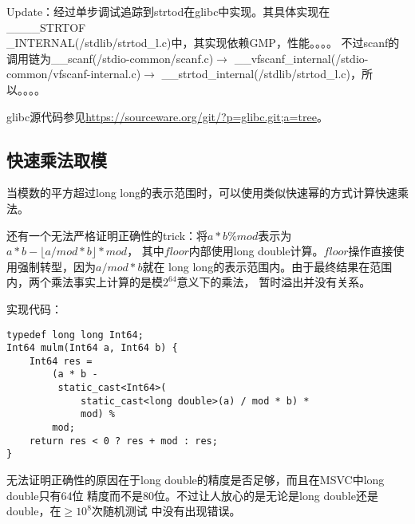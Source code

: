 Update：经过单步调试追踪到strtod在glibc中实现。其具体实现在
\_\_\_\_STRTOF\\\_INTERNAL(/stdlib/strtod\_l.c)中，其实现依赖GMP，性能。。。。
不过scanf的调用链为\_\_scanf(/stdio-common/scanf.c)$\rightarrow$
\_\_vfscanf\_internal(/stdio-common/vfscanf-internal.c)$\rightarrow$
\_\_strtod\_internal(/stdlib/strtod\_l.c)，所以。。。。

glibc源代码参见\url{https://sourceware.org/git/?p=glibc.git;a=tree}。
\subsection{快速乘法取模}
当模数的平方超过long long的表示范围时，可以使用类似快速幂的方式计算快速乘法。

还有一个无法严格证明正确性的trick：将$a*b\%mod$表示为$a*b-\lfloor a/mod*b\rfloor*mod$，
其中$floor$内部使用long double计算。$floor$操作直接使用强制转型，因为$a/mod*b$就在
long long的表示范围内。由于最终结果在范围内，两个乘法事实上计算的是模$2^{64}$意义下的乘法，
暂时溢出并没有关系。

实现代码：
\begin{lstlisting}
typedef long long Int64;
Int64 mulm(Int64 a, Int64 b) {
    Int64 res =
        (a * b -
         static_cast<Int64>(
             static_cast<long double>(a) / mod * b) *
             mod) %
        mod;
    return res < 0 ? res + mod : res;
}
\end{lstlisting}

无法证明正确性的原因在于long double的精度是否足够，而且在MSVC中long double只有64位
精度而不是80位。不过让人放心的是无论是long double还是double，在$\geq 10^8$次随机测试
中没有出现错误。

